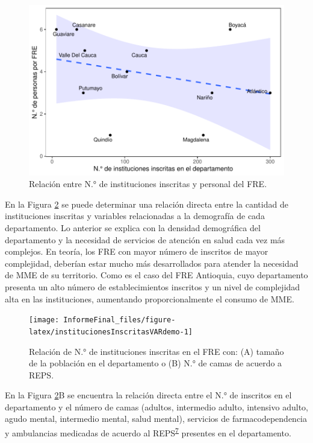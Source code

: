 \documentclass[
]{book}
\begin{document}
\begin{figure}[t]

{\centering \includegraphics[width=0.85\linewidth]{InformeFinal_files/figure-latex/institucionesInscritasRelacion-1} 

}

\caption{Relación entre N.° de instituciones inscritas y personal del FRE.}\label{fig:institucionesInscritasRelacion}
\end{figure}

En la Figura \ref{fig:institucionesInscritasVARdemo} se puede determinar una relación directa entre la cantidad de instituciones inscritas y variables relacionadas a la demografía de cada departamento. Lo anterior se explica con la densidad demográfica del departamento y la necesidad de servicios de atención en salud cada vez más complejos. En teoría, los FRE con mayor número de inscritos de mayor complejidad, deberían estar mucho más desarrollados para atender la necesidad de MME de su territorio. Como es el caso del FRE Antioquia, cuyo departamento presenta un alto número de establecimientos inscritos y un nivel de complejidad alta en las instituciones, aumentando proporcionalmente el consumo de MME.

\begin{figure}[b!]

{\centering \texttt{[image: InformeFinal\_files/figure-latex/institucionesInscritasVARdemo-1]} 

}

\caption{Relación de N.° de instituciones inscritas en el FRE con: (A) tamaño de la población en el departamento o (B) N.° de camas de acuerdo a REPS.}\label{fig:institucionesInscritasVARdemo}
\end{figure}

En la Figura \ref{fig:institucionesInscritasVARdemo}B se encuentra la relación directa entre el N.° de inscritos en el departamento y el número de camas (adultos, intermedio adulto, intensivo adulto, agudo mental, intermedio mental, salud mental), servicios de farmacodependencia y ambulancias medicadas de acuerdo al REPS\textsuperscript{\protect\hyperlink{ref-DireccionPrestaciondeServiciosyAtencionPrimaria2021}{7}} presentes en el departamento.
\end{document}
